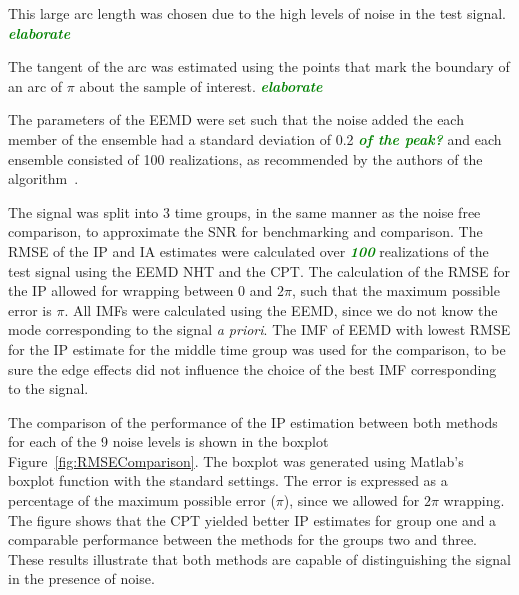 \documentclass[a4paper]{IEEEtran}
\newcommand{\dean}[1]{\textsf{\emph{\textbf{\textcolor{green}{#1}}}}}
\begin{document}
This large arc length was chosen due to the high levels of noise in the test signal. \dean{elaborate}

The tangent of the arc was estimated using the points that mark the boundary of an arc of $\pi$ about the sample of interest. \dean{elaborate}

The parameters of the EEMD were set such that the noise added the each member of the ensemble had a standard deviation of 0.2 \dean{of the peak?} and each ensemble consisted of 100 realizations, as recommended by the authors of the algorithm~\cite{Wu2009}.

The signal was split into $3$ time groups, in the same manner as the noise free comparison, to approximate the SNR for benchmarking and comparison. The RMSE of the IP and IA estimates were calculated over \dean{100} realizations of the test signal using the EEMD NHT and the CPT. The calculation of the RMSE for the IP allowed for wrapping between $0$ and $2\pi$, such that the maximum possible error is $\pi$. All IMFs were calculated using the EEMD, since we do not know the mode corresponding to the signal \emph{a priori}. The IMF of EEMD with lowest RMSE for the IP estimate for the middle time group was used for the comparison, to be sure the edge effects did not influence the choice of the best IMF corresponding to the signal. 

The comparison of the performance of the IP estimation between both methods for each of the 9 noise levels is shown in the boxplot Figure~\ref{fig:RMSEComparison}. The boxplot was generated using Matlab's boxplot function with the standard settings. The error is expressed as a percentage of the maximum possible error ($\pi$), since we allowed for $2\pi$ wrapping. The figure shows that the CPT yielded better IP estimates for group one and a comparable performance between the methods for the groups two and three. These results illustrate that both methods are capable of distinguishing the signal in the presence of noise. 
\end{document}

